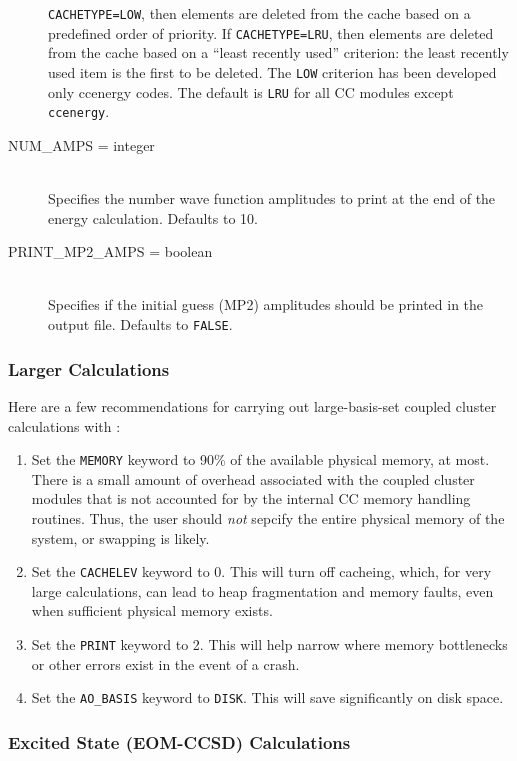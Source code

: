 \begin{description}
{\tt CACHETYPE=LOW}, then elements are deleted from the cache based on a
predefined order of priority.  If {\tt CACHETYPE=LRU}, then elements are
deleted from the cache based on a ``least recently used'' criterion: the
least recently used item is the first to be deleted.  The {\tt LOW}
criterion has been developed only ccenergy codes.  The default is {\tt LRU}
for all CC modules except {\tt ccenergy}.
\item[NUM\_AMPS = integer]\mbox{}\\
Specifies the number wave function amplitudes to print at the end of the
energy calculation.  Defaults to 10.
\item[PRINT\_MP2\_AMPS = boolean]\mbox{}\\
Specifies if the initial guess (MP2) amplitudes should be printed in the
output file.  Defaults to {\tt FALSE}.
\end{description}

\subsubsection{Larger Calculations}

Here are a few recommendations for carrying out large-basis-set coupled cluster calculations with \PSIthree: 
\begin{enumerate}
\item Set the {\tt MEMORY} keyword to 90\% of the available physical
memory, at most.  There is a small amount of overhead associated with the
coupled cluster modules that is not accounted for by the internal CC memory
handling routines.  Thus, the user should {\em not} sepcify the entire
physical memory of the system, or swapping is likely.
\item Set the {\tt CACHELEV} keyword to 0.  This will turn off cacheing,
which, for very large calculations, can lead to heap fragmentation and
memory faults, even when sufficient physical memory exists.
\item Set the {\tt PRINT} keyword to 2.  This will help narrow where
memory bottlenecks or other errors exist in the event of a crash.
\item Set the {\tt AO\_BASIS} keyword to {\tt DISK}.  This will save
significantly on disk space.
\end{enumerate}

\subsubsection{Excited State (EOM-CCSD) Calculations}

